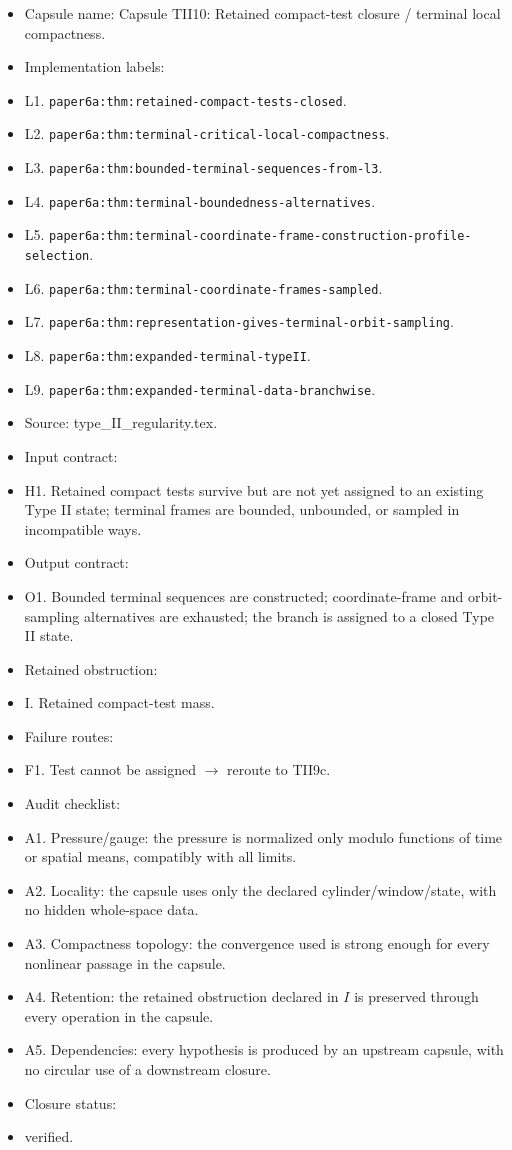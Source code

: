 \documentclass[11pt]{amsart}
\begin{document}
\begin{itemize}
  \item Capsule name: Capsule TII10: Retained compact-test closure / terminal local compactness.
  \item Implementation labels:
  \item L1. \texttt{paper6a:thm:retained-compact-tests-closed}.
  \item L2. \texttt{paper6a:thm:terminal-critical-local-compactness}.
  \item L3. \texttt{paper6a:thm:bounded-terminal-sequences-from-l3}.
  \item L4. \texttt{paper6a:thm:terminal-boundedness-alternatives}.
  \item L5. \texttt{paper6a:thm:terminal-coordinate-frame-construction-profile-selection}.
  \item L6. \texttt{paper6a:thm:terminal-coordinate-frames-sampled}.
  \item L7. \texttt{paper6a:thm:representation-gives-terminal-orbit-sampling}.
  \item L8. \texttt{paper6a:thm:expanded-terminal-typeII}.
  \item L9. \texttt{paper6a:thm:expanded-terminal-data-branchwise}.
  \item Source: type\_II\_regularity.tex.
  \item Input contract:
  \item H1. Retained compact tests survive but are not yet assigned to an existing Type II state; terminal frames are bounded, unbounded, or sampled in incompatible ways.
  \item Output contract:
  \item O1. Bounded terminal sequences are constructed; coordinate-frame and orbit-sampling alternatives are exhausted; the branch is assigned to a closed Type II state.
  \item Retained obstruction:
  \item I. Retained compact-test mass.
  \item Failure routes:
  \item F1. Test cannot be assigned $\to$ reroute to TII9c.
  \item Audit checklist:
  \item A1. Pressure/gauge: the pressure is normalized only modulo functions of time or spatial means, compatibly with all limits.
  \item A2. Locality: the capsule uses only the declared cylinder/window/state, with no hidden whole-space data.
  \item A3. Compactness topology: the convergence used is strong enough for every nonlinear passage in the capsule.
  \item A4. Retention: the retained obstruction declared in $I$ is preserved through every operation in the capsule.
  \item A5. Dependencies: every hypothesis is produced by an upstream capsule, with no circular use of a downstream closure.
  \item Closure status:
  \item verified.
\end{itemize}
\end{document}
